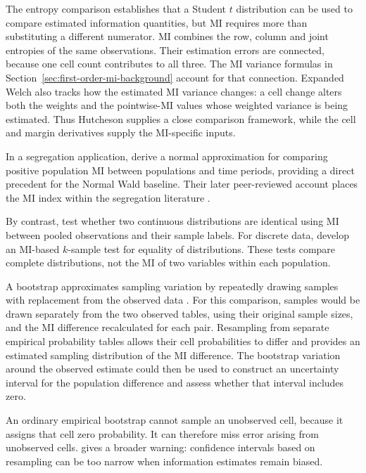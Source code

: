The entropy comparison establishes that a Student \(t\) distribution can
be used to compare estimated information quantities, but MI requires
more than substituting a different numerator. MI combines the row,
column and joint entropies of the same observations. Their estimation
errors are connected, because one cell count contributes to all three.
The MI variance formulas in Section~\ref{sec:first-order-mi-background}
account for that connection. Expanded Welch also tracks how the estimated
MI variance changes: a cell change alters
both the weights and the pointwise-MI values whose weighted variance is
being estimated. Thus Hutcheson supplies a close comparison framework,
while the cell and margin derivatives supply the MI-specific inputs.

In a segregation application, \citet{mora2009} derive a normal approximation
for comparing positive population MI between populations and time periods,
providing a direct precedent for the Normal Wald baseline. Their later
peer-reviewed account places the MI index within the segregation literature
\citep{mora2011}.

By contrast, \citet{guha2014} test whether two continuous distributions are identical
using MI between pooled observations and their sample labels.
For discrete data, \citet{drake2014} develop an MI-based \(k\)-sample test
for equality of distributions. These tests compare complete distributions,
not the MI of two variables within each population.

\medskip
{}

A bootstrap approximates sampling variation by repeatedly drawing samples
with replacement from the observed data \citep{efron1979}. For this
comparison, samples would be drawn separately from the two observed tables,
using their original sample sizes, and the MI difference recalculated for
each pair. Resampling from separate empirical probability tables allows
their cell probabilities to differ and provides an estimated sampling
distribution of the MI difference. The bootstrap
variation around the observed estimate could then be used to construct
an uncertainty interval for the population difference and assess whether
that interval includes zero.

An ordinary empirical bootstrap cannot sample an unobserved cell, because it
assigns that cell zero probability. It can therefore miss error arising from
unobserved cells. \citet{paninski2003} gives a broader warning: confidence
intervals based on resampling can be too narrow when information estimates
remain biased.

